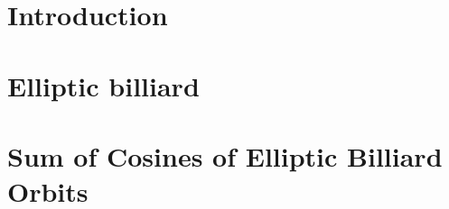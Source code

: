 
\section{ Introduction}
\label{sec:04_introd}



\section{Elliptic billiard }
\label{sec:elliptic_billiard}


 \section{Sum of Cosines of Elliptic Billiard Orbits}
\label{sec:invariant_elliptic_billiard}
